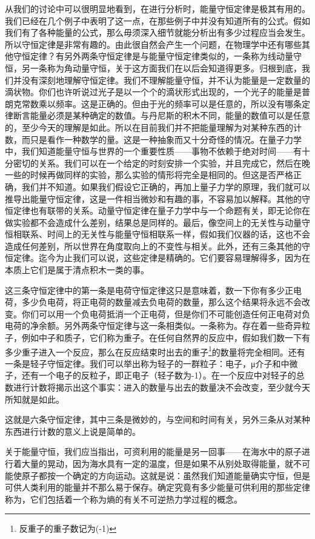 从我们的讨论中可以很明显地看到，在进行分析时，能量守恒定律是极其有用的。我们已经在几个例子中表明了这一点，在那些例子中并没有知道所有的公式。假如我们有了各种能量的公式，那么毋须深入细节就能分析出有多少过程应当会发生。所以守恒定律是非常有趣的。由此很自然会产生一个问题，在物理学中还有哪些其他守恒定律？有另外两条守恒定律是与能量守恒定律类似的，一条称为线动量守恒，另一条称为角动量守恒，关于这方面我们在以后会知道得更多。归根到底，我们并没有深刻地理解守恒定律。我们不理解能量守恒，并不认为能量是一定数量的滴状物。你们也许听说过光子是以一个个的滴状形式出现的，一个光子的能量是普朗克常数乘以频率。这是正确的。但由于光的频率可以是任意的，所以没有哪条定律断言能量必须是某种确定的数值。与丹尼斯的积木不同，能量的数值可以是任意的，至少今天的理解是如此。所以在目前我们并不把能量理解为对某种东西的计数，而只是看作一种数学的量。这是一种抽象而又十分奇怪的情况。在量子力学中，我们知道能量守恒与世界的一个重要性质——事物不依赖于绝对时间——有十分密切的关系。我们可以在一个给定的时刻安排一个实验，并且完成它，然后在晚一些的时候再做同样的实验，那么实验的情形将完全是相同的。但这是否严格正确，我们并不知道。如果我们假设它正确的，再加上量子力学的原理，我们就可以推导出能量守恒定律，这是一件相当微妙和有趣的事，不容易加以解释。其他的守恒定律也有联带的关系。动量守恒定律在量子力学中与一个命题有关，即无论你在做实验都不会造成什么差别，结果总是同样的。最后，像空间上的无关性与动量守恒相联系、时间上的无关性与能量守恒相联系一样，假如我们仪器的话，这也不会造成任何差别，所以世界在角度取向上的不变性与相关。此外，还有三条其他的守恒定律。迄今为止我们可以说，这些定律是精确的。它们要容易理解得多，因为在本质上它们是属于清点积木一类的事。

这三条守恒定律中的第一条是电荷守恒定律这只是意味着，数一下你有多少正电荷，多少负电荷，将正电荷的数量减去负电荷的数量，那么这个结果将永远不会改变。你们可以用一个负电荷抵消一个正电荷，但是你们不可能创造任何正电荷对负电荷的净余额。另外两条守恒定律与这一条相类似。一条称为。存在着一些奇异粒子，例如中子和质子，它们称为重子。在任何自然界的反应中，假如我们数一下有多少重子进入一个反应，那么在反应结束时出去的重子\footnote{反重子的重子数记为(-1)}的数量将完全相同。还有一条是轻子守恒定律。我们可以举出称为轻子的一群粒子：电子，μ介子和中微子，还有一个电子的反粒子，即正电子（轻子数为-1）。在一个反应中对轻子的总数进行计数将揭示出这个事实：进入的数量与出去的数量决不会改变，至少就今天所知就是如此。

这就是六条守恒定律，其中三条是微妙的，与空间和时间有关，另外三条从对某种东西进行计数的意义上说是简单的。

关于能量守恒，我们应当指出，可资利用的能量是另一回事——在海水中的原子进行着大量的晃动，因为海水具有一定的温度，但是如果不从别处取得能量，就不可能使原子都按一个确定的方向运动。这就是说：虽然我们知道能量确实守恒，但是可供人类利用的能量并不那么易于保存。确定究竟有多少能量可供利用的那些定律称为，它们包括着一个称为熵的有关不可逆热力学过程的概念。

